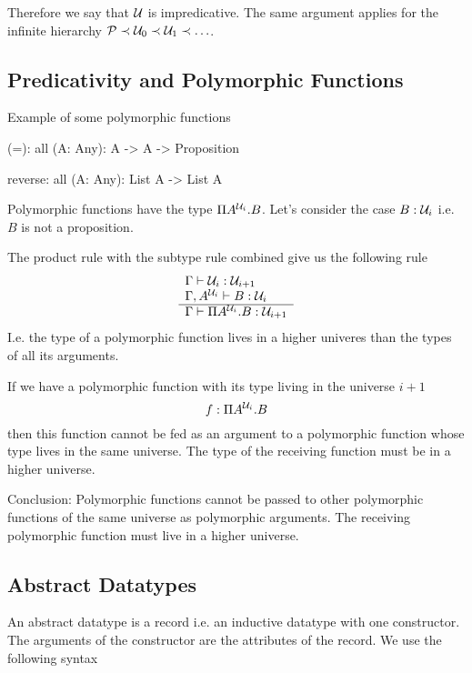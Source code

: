 Therefore we say that ${\cal{U}}$ is impredicative. The same argument applies for
the infinite hierarchy ${\cal{P}} \prec {\cal{U}}_0 \prec {\cal{U}}_1 \prec \ldots$.




\subsection{Predicativity and Polymorphic Functions}

Example of some polymorphic functions
\begin{alba}
    (=): all (A: Any): A -> A -> Proposition

    reverse: all (A: Any): List A -> List A
\end{alba}

\noindent Polymorphic functions have the type $\Pi A^{{\cal{U}}_i}. B$. Let's
consider the case $B: {\cal{U}}_i$ i.e. $B$ is not a proposition.

The product rule with the subtype rule combined give us the following rule
$$
\rulev
{
    \Gamma \vdash \Any_i : \Any_{i + 1}
    \\
    \Gamma, A^{\Any_i} \vdash B: \Any_i

}
{
    \Gamma \vdash \Pi A^{\Any_i}. B : \Any_{i + 1}
}
$$
I.e. the type of a polymorphic function lives in a higher univeres than the
types of all its arguments.

If we have a polymorphic function with its type living in the universe $i + 1$
$$
    f: \Pi A^{{\cal{U}}_i}. B
$$
then this function cannot be fed as an argument to a polymorphic function
whose type lives in the same universe. The type of the receiving function
must be in a higher universe.

Conclusion: Polymorphic functions cannot be passed to other polymorphic
functions of the same universe as polymorphic arguments. The receiving
polymorphic function must live in a higher universe.









\subsection{Abstract Datatypes}
\label{sec:abstract-datatypes}


An abstract datatype is a record i.e. an inductive datatype with one
constructor. The arguments of the constructor are the attributes of the record.
We use the following syntax

